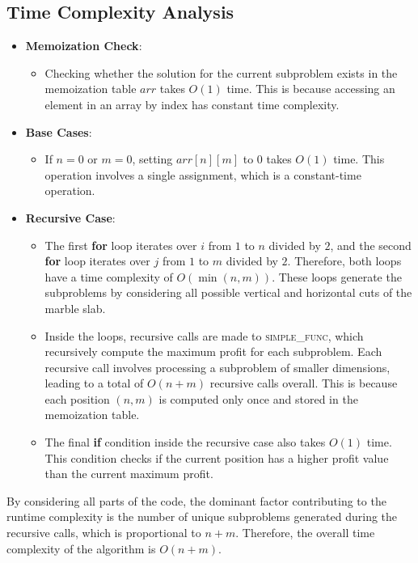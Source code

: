 \documentclass{article}
\begin{document}
\subsection{Time Complexity Analysis}
\begin{itemize}
    \item \textbf{Memoization Check}:
        \begin{itemize}
            \item Checking whether the solution for the current subproblem exists in the memoization table $arr$ takes $O(1)$ time. This is because accessing an element in an array by index has constant time complexity.
        \end{itemize}
        
    \item \textbf{Base Cases}:
        \begin{itemize}
            \item If $n = 0$ or $m = 0$, setting $arr[n][m]$ to $0$ takes $O(1)$ time. This operation involves a single assignment, which is a constant-time operation.
        \end{itemize}
        
    \item \textbf{Recursive Case}:
        \begin{itemize}
            \item The first \textbf{for} loop iterates over $i$ from $1$ to $n$ divided by $2$, and the second \textbf{for} loop iterates over $j$ from $1$ to $m$ divided by $2$. Therefore, both loops have a time complexity of $O(\min(n, m))$. These loops generate the subproblems by considering all possible vertical and horizontal cuts of the marble slab.
            \item Inside the loops, recursive calls are made to \textsc{simple\_func}, which recursively compute the maximum profit for each subproblem. Each recursive call involves processing a subproblem of smaller dimensions, leading to a total of $O(n + m)$ recursive calls overall. This is because each position $(n, m)$ is computed only once and stored in the memoization table.
            \item The final \textbf{if} condition inside the recursive case also takes $O(1)$ time. This condition checks if the current position has a higher profit value than the current maximum profit.
        \end{itemize}
\end{itemize}

By considering all parts of the code, the dominant factor contributing to the runtime complexity is the number of unique subproblems generated during the recursive calls, which is proportional to $n + m$. Therefore, the overall time complexity of the algorithm is $O(n + m)$.
\end{document}

